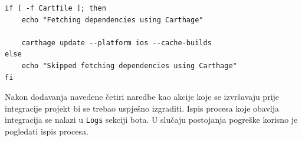 \documentclass[times, utf8, diplomski, numeric]{fer}
\begin{document}
\begin{appendices}
\begin{verbatim}
if [ -f Cartfile ]; then
    echo "Fetching dependencies using Carthage"

    carthage update --platform ios --cache-builds
else
    echo "Skipped fetching dependencies using Carthage"
fi
\end{verbatim}

Nakon dodavanja navedene četiri naredbe kao akcije koje se izvršavaju prije integracije projekt bi se trebao uspješno izgraditi. Ispis procesa koje obavlja integracija se nalazi u \verb|Logs| sekciji bota. U slučaju postojanja pogreške korisno je pogledati ispis procesa.
















\end{appendices}
\end{document}
